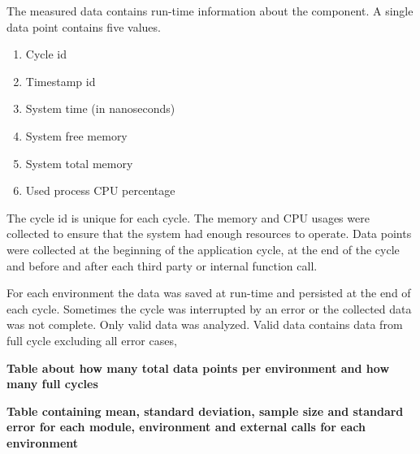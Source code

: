 The measured data contains run-time information about the component.
A single data point contains five values.
\begin{enumerate}
    \item Cycle id
    \item Timestamp id
    \item System time (in nanoseconds)
    \item System free memory
    \item System total memory
    \item Used process CPU percentage
\end{enumerate}

The cycle id is unique for each cycle.
The memory and CPU usages were collected to ensure that the system had enough resources to operate.
Data points were collected at the beginning of the application cycle, at the end of the cycle and before and after each third party or internal function call.

For each environment the data was saved at run-time and persisted at the end of each cycle.
Sometimes the cycle was interrupted by an error or the collected data was not complete.
Only valid data was analyzed.
Valid data contains data from full cycle excluding all error cases,

\textbf{Table about how many total data points per environment and how many full cycles}

\textbf{Table containing mean, standard deviation, sample size and standard error for each module, environment and external calls for each environment}












